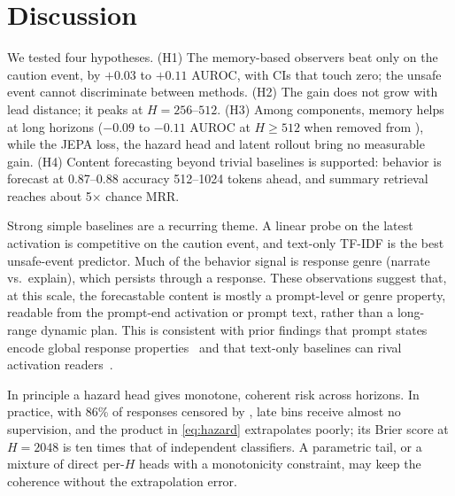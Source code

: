 \section{Discussion}
\label{sec:discussion}

We tested four hypotheses.
(H1) The memory-based observers beat \directao only on the caution event, by $+0.03$ to $+0.11$ AUROC, with CIs that touch zero; the unsafe event cannot discriminate between methods.
(H2) The gain does not grow with lead distance; it peaks at $H=256$--$512$.
(H3) Among components, memory helps at long horizons ($-0.09$ to $-0.11$ AUROC at $H \ge 512$ when removed from \roll), while the JEPA loss, the hazard head and latent rollout bring no measurable gain.
(H4) Content forecasting beyond trivial baselines is supported: behavior is forecast at 0.87--0.88 accuracy 512--1024 tokens ahead, and summary retrieval reaches about 5$\times$ chance MRR.

Strong simple baselines are a recurring theme.
A linear probe on the latest activation is competitive on the caution event, and text-only TF-IDF is the best unsafe-event predictor.
Much of the behavior signal is response genre (\eg narrate vs.\ explain), which persists through a response.
These observations suggest that, at this scale, the forecastable content is mostly a prompt-level or genre property, readable from the prompt-end activation or prompt text, rather than a long-range dynamic plan.
This is consistent with prior findings that prompt states encode global response properties~\citep{dong2025emergent} and that text-only baselines can rival activation readers~\citep{bauer2026building}.

In principle a hazard head gives monotone, coherent risk across horizons.
In practice, with 86\% of responses censored by \eos, late bins receive almost no supervision, and the product in \eqref{eq:hazard} extrapolates poorly; its Brier score at $H=2048$ is ten times that of independent classifiers.
A parametric tail, or a mixture of direct per-$H$ heads with a monotonicity constraint, may keep the coherence without the extrapolation error.

